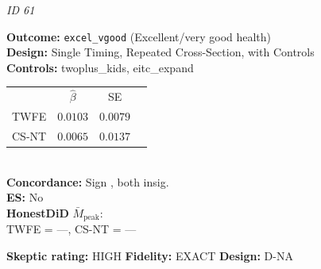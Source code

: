 \begin{tcolorbox}[
  colback=white, colframe=black!60, boxrule=0.4pt,
  arc=2pt, left=4pt, right=4pt, top=3pt, bottom=3pt]
  \footnotesize
  \textbf{\textcite{evans2014giving}} \hfill \textit{ID 61}\\[2pt]
  
  \begin{minipage}[t]{0.45\textwidth}
    \textbf{Outcome:} \texttt{excel\_vgood} (Excellent/very good health)\\
    \textbf{Design:} Single Timing, Repeated Cross-Section, with Controls\\
    \textbf{Controls:} twoplus\_kids, eitc\_expand
  \end{minipage}\hfill
  \begin{minipage}[t]{0.45\textwidth}
    \begin{tabular}{@{}lccc@{}}
      & $\hat{\beta}$ & SE & \\
      TWFE & $0.0103$ & $0.0079$ &  \\
      CS-NT & $0.0065$ & $0.0137$ &  \\
    \end{tabular}\\[3pt]
    \textbf{Concordance:} Sign \checkmark, both insig.\\
    \textbf{ES:} No\\
    \textbf{HonestDiD} $\bar{M}_{\text{peak}}$:\\
    TWFE = ---, CS-NT = ---
  \end{minipage}
  \tcbline
  \textbf{Skeptic rating:} HIGH \hfill \textbf{Fidelity:} EXACT \hfill \textbf{Design:} D-NA
\end{tcolorbox}
\vspace{6pt}

